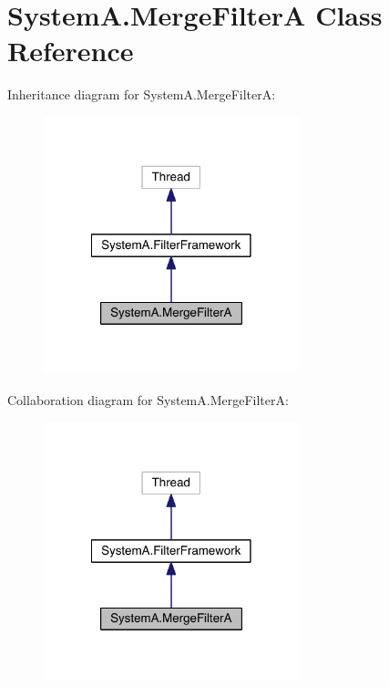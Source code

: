 \hypertarget{class_system_a_1_1_merge_filter_a}{}\section{System\+A.\+Merge\+Filter\+A Class Reference}
\label{class_system_a_1_1_merge_filter_a}


Inheritance diagram for System\+A.\+Merge\+Filter\+A\+:\nopagebreak
\begin{figure}[H]
\begin{center}
\leavevmode
\includegraphics[width=210pt]{class_system_a_1_1_merge_filter_a__inherit__graph}
\end{center}
\end{figure}


Collaboration diagram for System\+A.\+Merge\+Filter\+A\+:\nopagebreak
\begin{figure}[H]
\begin{center}
\leavevmode
\includegraphics[width=210pt]{class_system_a_1_1_merge_filter_a__coll__graph}
\end{center}
\end{figure}

